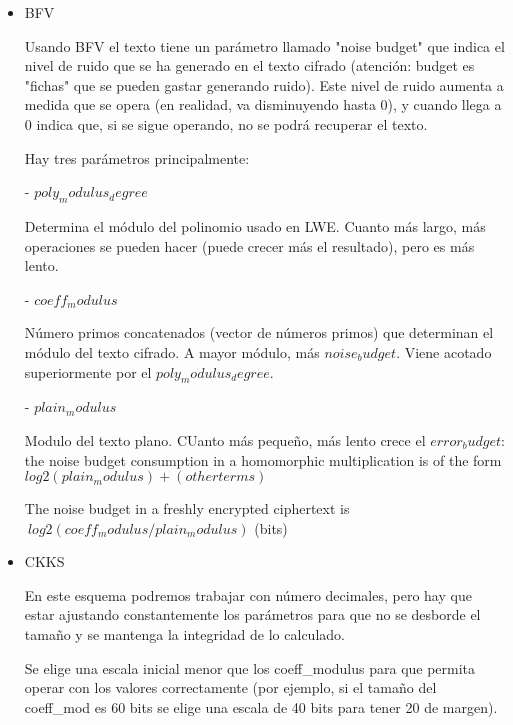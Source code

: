 \begin{itemize}
  
  \item BFV

  Usando BFV el texto tiene un parámetro llamado "noise budget" que indica el nivel de ruido que se ha generado en el texto cifrado (atención: budget es "fichas" que se pueden gastar generando ruido). Este nivel de ruido aumenta a medida que se opera (en realidad, va disminuyendo hasta 0), y cuando llega a 0 indica que, si se sigue operando, no se podrá recuperar el texto.


  Hay tres parámetros principalmente:

  - $poly_modulus_degree$

  Determina el módulo del polinomio usado en LWE. Cuanto más largo, más operaciones se pueden hacer (puede crecer más el resultado), pero es más lento.

  - $coeff_modulus$

  Número primos concatenados (vector de números primos) que determinan el módulo del texto cifrado. A mayor módulo, más $noise_budget$. Viene acotado superiormente por el $poly_modulus_degree$.

  - $plain_modulus$

  Modulo del texto plano. CUanto más pequeño, más lento crece el $error_budget$: the noise budget consumption in a homomorphic multiplication is of the form $log2(plain_modulus) + (other terms)$

  The noise budget in a freshly encrypted ciphertext is $~ log2(coeff_modulus/plain_modulus)$  (bits)


  \item CKKS

  En este esquema podremos trabajar con número decimales, pero hay que estar ajustando constantemente los parámetros para que no se desborde el tamaño y se mantenga la integridad de lo calculado.

  Se elige una escala inicial menor que los coeff\_modulus para que permita operar con los valores correctamente (por ejemplo, si el tamaño del coeff\_mod es 60 bits se elige una escala de 40 bits para tener 20 de margen).


\end{itemize}
